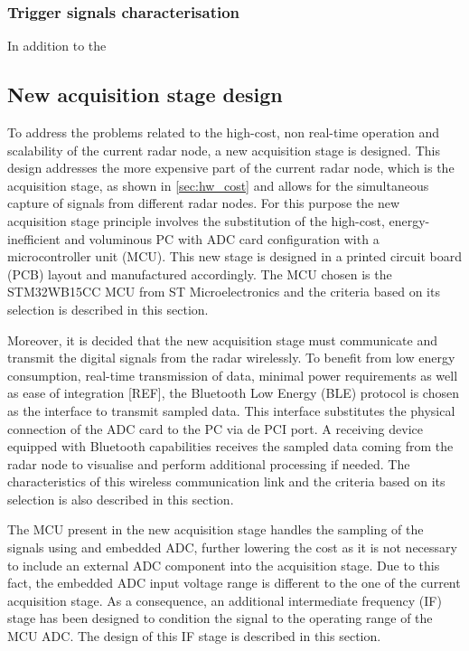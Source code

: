 \subsubsection{Trigger signals characterisation}

In addition to the 



\subsection{New acquisition stage design}

To address the problems related to the high-cost, non real-time operation and scalability of the current radar node, a new acquisition stage is designed. This design addresses the more expensive part of the current radar node, which is the acquisition stage, as shown in \cref{sec:hw_cost} and allows for the simultaneous capture of signals from different radar nodes. For this purpose the new acquisition stage principle involves the substitution of the high-cost, energy-inefficient and voluminous PC with ADC card configuration with a microcontroller unit (MCU). This new stage is designed in a printed circuit board (PCB) layout and manufactured accordingly. The MCU chosen is the STM32WB15CC MCU from ST Microelectronics \cite{STMicroelectronics2022} and the criteria based on its selection is described in this section.

Moreover, it is decided that the new acquisition stage must communicate and transmit the digital signals from the radar wirelessly. To benefit from low energy consumption, real-time transmission of data, minimal power requirements as well as ease of integration [REF], the Bluetooth Low Energy (BLE) protocol is chosen as the interface to transmit sampled data. This interface substitutes the physical connection of the ADC card to the PC via de PCI port. A receiving device equipped with Bluetooth capabilities receives the sampled data coming from the radar node to visualise and perform additional processing if needed. The characteristics of this wireless communication link and the criteria based on its selection is also described in this section.

The MCU present in the new acquisition stage handles the sampling of the signals using and embedded ADC, further lowering the cost as it is not necessary to include an external ADC component into the acquisition stage. Due to this fact, the embedded ADC input voltage range is different to the one of the current acquisition stage. As a consequence, an additional intermediate frequency (IF) stage has been designed to condition the signal to the operating range of the MCU ADC. The design of this IF stage is described in this section.



